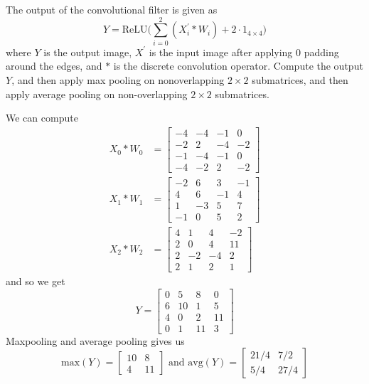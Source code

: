 \begin{example}
    The output of the convolutional filter is given as 
    \begin{equation}
      Y = \mathrm{ReLU} \bigg( \sum_{i=0}^2 (X_i^\prime \ast W_i) + 2 \cdot 1_{4 \times 4}\bigg)
    \end{equation}
    where $Y$ is the output image, $X^\prime$ is the input image after applying $0$ padding around the edges, and $\ast$ is the discrete convolution operator. Compute the output $Y$, and then apply max pooling on nonoverlapping $2 \times 2$ submatrices, and then apply average pooling on non-overlapping $2 \times 2$ submatrices. 
  \end{example}
  \begin{solution}
    We can compute 
    \begin{align*} 
      X_0 \ast  W_0 & = \begin{bmatrix} -4 & -4 & -1 & 0 \\ -2 & 2 & -4 & -2 \\ -1 & -4 & -1 & 0 \\ -4 & -2 & 2 & -2 \end{bmatrix} \\
      X_1 \ast W_1 & = \begin{bmatrix} -2 & 6 & 3 & -1 \\ 4 & 6 & -1 & 4 \\ 1 & -3 & 5 & 7 \\ -1 & 0 & 5 & 2 \end{bmatrix} \\
      X_2 \ast W_2 & = \begin{bmatrix} 4 & 1 & 4 & -2 \\ 2 & 0 & 4 & 11 \\ 2 & -2 & -4 & 2 \\ 2 & 1 & 2 & 1 \end{bmatrix}
    \end{align*}
    and so we get 
    \begin{equation}
      Y = \begin{bmatrix} 0 & 5 & 8 & 0 \\ 6 & 10 & 1 & 5 \\ 4 &  0 & 2 & 11 \\ 0 & 1 & 11 & 3 \end{bmatrix}
    \end{equation}
    Maxpooling and average pooling gives us 
    \begin{equation}
      \mathrm{max}(Y) = \begin{bmatrix} 10 & 8 \\ 4 & 11 \end{bmatrix} \text{ and } \mathrm{avg}(Y) = \begin{bmatrix} 21/4 & 7/2 \\ 5/4 & 27/4 \end{bmatrix}
    \end{equation}
  \end{solution}

